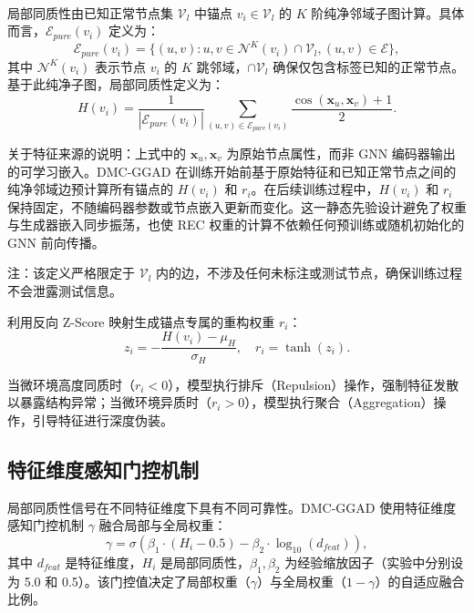 ﻿﻿﻿﻿    \documentclass[conference, onecolumn]{IEEEtran}
\begin{document}
    局部同质性由已知正常节点集 $\mathcal{V}_l$ 中锚点 $v_i \in \mathcal{V}_l$ 的 $K$ 阶纯净邻域子图计算。具体而言，$\mathcal{E}_{pure}(v_i)$ 定义为：
    \begin{equation}
    \mathcal{E}_{pure}(v_i) = \{(u, v) : u, v \in \mathcal{N}^K(v_i) \cap \mathcal{V}_l, (u,v) \in \mathcal{E}\},
    \end{equation}
    其中 $\mathcal{N}^K(v_i)$ 表示节点 $v_i$ 的 $K$ 跳邻域，$\cap \mathcal{V}_l$ 确保仅包含标签已知的正常节点。基于此纯净子图，局部同质性定义为：
    \begin{equation}
    H(v_i) = \frac{1}{|\mathcal{E}_{pure}(v_i)|} \sum_{(u,v) \in \mathcal{E}_{pure}(v_i)} \frac{\cos(\mathbf{x}_u, \mathbf{x}_v) + 1}{2}.
    \end{equation}
    
    \noindent 关于特征来源的说明：上式中的 $\mathbf{x}_u, \mathbf{x}_v$ 为原始节点属性，而非 GNN 编码器输出的可学习嵌入。DMC-GGAD 在训练开始前基于原始特征和已知正常节点之间的纯净邻域边预计算所有锚点的 $H(v_i)$ 和 $r_i$。在后续训练过程中，$H(v_i)$ 和 $r_i$ 保持固定，不随编码器参数或节点嵌入更新而变化。这一静态先验设计避免了权重与生成器嵌入同步振荡，也使 REC 权重的计算不依赖任何预训练或随机初始化的 GNN 前向传播。
    
    注：该定义严格限定于 $\mathcal{V}_l$ 内的边，不涉及任何未标注或测试节点，确保训练过程不会泄露测试信息。

    利用反向 Z-Score 映射生成锚点专属的重构权重 $r_i$：
    \begin{equation}
    z_i = -\frac{H(v_i) - \mu_H}{\sigma_H}, \quad r_i = \tanh(z_i).
    \end{equation}

    当微环境高度同质时（$r_i < 0$），模型执行排斥（Repulsion）操作，强制特征发散以暴露结构异常；当微环境异质时（$r_i > 0$），模型执行聚合（Aggregation）操作，引导特征进行深度伪装。

    \subsection{特征维度感知门控机制}
    局部同质性信号在不同特征维度下具有不同可靠性。DMC-GGAD 使用特征维度感知门控机制 $\gamma$ 融合局部与全局权重：
    \begin{equation}
    \gamma = \sigma\left( \beta_1 \cdot (H_i - 0.5) - \beta_2 \cdot \log_{10}(d_{feat}) \right),
    \end{equation}
    其中 $d_{feat}$ 是特征维度，$H_i$ 是局部同质性，$\beta_1, \beta_2$ 为经验缩放因子（实验中分别设为 5.0 和 0.5）。该门控值决定了局部权重（$\gamma$）与全局权重（$1-\gamma$）的自适应融合比例。
    
\end{document}
